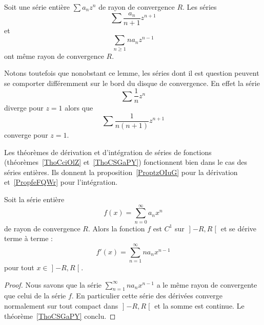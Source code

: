 \begin{lemma}       \label{LemFVMaSD}
	Soit une série entière \( \sum a_nz^n\) de rayon de convergence \( R\). Les séries
	\begin{equation}
		\sum \frac{ a_n }{ n+1 }z^{n+1}
	\end{equation}
	et
	\begin{equation}
		\sum_{n\geq 1}na_nz^{n-1}
	\end{equation}
	ont même rayon de convergence \( R\).
\end{lemma}

Notons toutefois que nonobstant ce lemme, les séries dont il est question peuvent se comporter différemment sur le bord du disque de convergence. En effet la série
\begin{equation}
	\sum \frac{1}{ n }z^n
\end{equation}
diverge pour \( z=1\) alors que
\begin{equation}
	\sum\frac{1}{ n(n+1) }z^{n+1}
\end{equation}
converge pour \( z=1\).


Les théorèmes de dérivation et d'intégration de séries de fonctions (théorèmes~\ref{ThoCciOlZ} et~\ref{ThoCSGaPY}) fonctionnent bien dans le cas des séries entières. Ils donnent la proposition~\ref{ProptzOIuG} pour la dérivation et~\ref{PropfeFQWr} pour l'intégration.

\begin{proposition}     \label{ProptzOIuG}
	Soit la série entière
	\begin{equation}
		f(x)=\sum_{n=0}^{\infty}a_n x^n
	\end{equation}
	de rayon de convergence \( R\). Alors la fonction \( f\) est \( C^1\) sur \( \mathopen] -R , R \mathclose[\) et se dérive terme à terme :
		\begin{equation}
			f'(x)=\sum_{n=1}^{\infty}na_nx^{n-1}
		\end{equation}
		pour tout \( x\in\mathopen] -R , R \mathclose[\).
\end{proposition}

\begin{proof}
	Nous savons que la série \( \sum_{n=1}^{\infty}na_nx^{n-1}\) a le même rayon de convergente que celui de la série \( f\). En particulier cette série des dérivées converge normalement sur tout compact dans \( \mathopen] -R , R \mathclose[\) et la somme est continue. Le théorème~\ref{ThoCSGaPY} conclu.
\end{proof}


